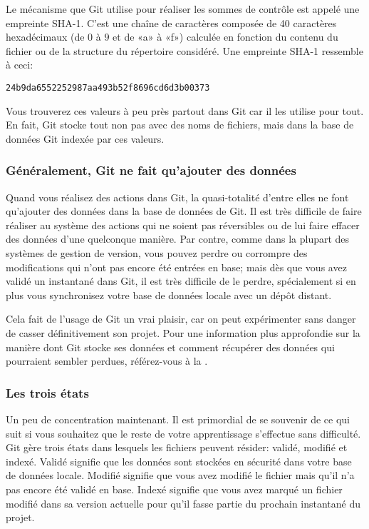 Le mécanisme que Git utilise pour réaliser les sommes de contrôle est appelé une empreinte SHA-1.
C'est une chaîne de caractères composée de 40 caractères hexadécimaux (de $0$ à $9$ et de «a» à «f») calculée en fonction du contenu du fichier ou de la structure du répertoire considéré.
Une empreinte SHA-1 ressemble à ceci:
\begin{Schunk}
\begin{Verbatim}
24b9da6552252987aa493b52f8696cd6d3b00373
\end{Verbatim}
\end{Schunk}

Vous trouverez ces valeurs à peu près partout dans Git car il les utilise pour tout.
En fait, Git stocke tout non pas avec des noms de fichiers, mais dans la base de données Git indexée par ces valeurs.

\subsubsection{Généralement, Git ne fait qu'ajouter des données}

Quand vous réalisez des actions dans Git, la quasi-totalité d'entre elles ne font qu'ajouter des données dans la base de données de Git.
Il est très difficile de faire réaliser au système des actions qui ne soient pas réversibles ou de lui faire effacer des données d'une quelconque manière.
Par contre, comme dans la plupart des systèmes de gestion de version, vous pouvez perdre ou corrompre des modifications qui n'ont pas encore été entrées en base;
mais dès que vous avez validé un instantané dans Git, il est très difficile de le perdre, spécialement si en plus vous synchronisez votre base de données locale avec un dépôt distant.

Cela fait de l'usage de Git un vrai plaisir, car on peut expérimenter sans danger de casser définitivement son projet.
Pour une information plus approfondie sur la manière dont Git stocke ses données et comment récupérer des données qui pourraient sembler perdues, référez-vous à la .

\subsubsection{Les trois états}

Un peu de concentration maintenant.
Il est primordial de se souvenir de ce qui suit si vous souhaitez que le reste de votre apprentissage s'effectue sans difficulté.
Git gère trois états dans lesquels les fichiers peuvent résider: validé, modifié et indexé.
Validé signifie que les données sont stockées en sécurité dans votre base de données locale.
Modifié signifie que vous avez modifié le fichier mais qu'il n'a pas encore été validé en base.
Indexé signifie que vous avez marqué un fichier modifié dans sa version actuelle pour qu'il fasse partie du prochain instantané du projet.

